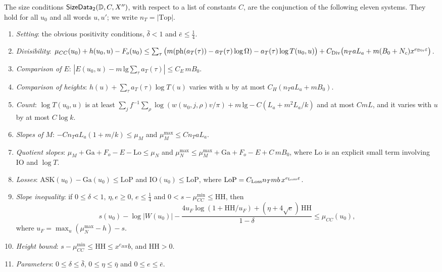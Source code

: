 The size conditions $\mathsf{SizeData}_2(\mathbb D,C,X'')$, with respect to a list of constants $C$,
are the conjunction of the following eleven systems. They hold for all $u_0$ and all words $u,u'$;
we write $n_T=|\mathrm{Top}|$.
\begin{enumerate}[label=(S\arabic*)]
\item\label{S:setting} \emph{Setting}: the obvious positivity conditions, $\bar\delta<1$ and $\bar e\le\frac14$.
\item\label{S:div} \emph{Divisibility}:
$\mu_{CC}(u_0)+h(u_0,u)-F_o(u_0)\le\sum_\tau\big(m(\mathrm{ph}(a_T(\tau))-a_T(\tau)\log\Omega)-a_T(\tau)\log T(u_0,u)\big)
+C_{\rm Div}\big(n_Ta L_a+m(B_0+N_c)x^{e_{\rm Div}\varepsilon}\big)$.
\item\label{S:ecomp} \emph{Comparison of $E$}: $|E(u_0,u)-m\,\mathrm{lg}\sum_\tau a_T(\tau)|\le C_E\,mB_0$.
\item\label{S:hcomp} \emph{Comparison of heights}:
$h(u)+\sum_\tau a_T(\tau)\log T(u)$ varies with $u$ by at most $C_H(n_TaL_a+mB_0)$.
\item\label{S:count} \emph{Count}: $\log T(u_0,u)$ is at least
$\sum_{j}f^{-1}\sum_\rho\log(w(u_0,j,\rho)v/\pi)+m\,\mathrm{lg}-C(L_a+m^2L_a/k)$ and at most $CmL$, and it
varies with $u$ by at most $C\log k$.
\item\label{S:slopes} \emph{Slopes of $M$}: $-C n_TaL_a(1+m/k)\le\mu_M$ and $\mu^{\max}_M\le Cn_TaL_a$.
\item\label{S:quot} \emph{Quotient slopes}:
$\mu_M+\mathrm{Ga}+F_o-E-\mathrm{Lo}\le\mu_N$ and $\mu^{\max}_N\le\mu^{\max}_M+\mathrm{Ga}+F_o-E+C\,mB_0$, where
$\mathrm{Lo}$ is an explicit small term involving $\mathrm{IO}$ and $\log T$.
\item\label{S:loss} \emph{Losses}: $\mathrm{ASK}(u_0)-\mathrm{Ga}(u_0)\le\mathrm{LoP}$ and $\mathrm{IO}(u_0)\le\mathrm{LoP}$,
where $\mathrm{LoP}=C_{\rm Loss}n_Tmb\,x^{e_{\rm Loss}\varepsilon}$.
\item\label{S:slopeineq} \emph{Slope inequality}: if $0\le\delta<1$, $\eta,e\ge0$, $e\le\frac14$ and
$0<s-\mu^{\min}_{CC}\le\mathrm{HH}$, then
\[
s(u_0)-\log|W(u_0)|-\frac{4u_F\log(1+\mathrm{HH}/u_F)+(\eta+4\sqrt e)\,\mathrm{HH}}{1-\delta}\le\mu_{CC}(u_0),
\]
where $u_F=\max_u(\mu^{\max}_N-h)-s$.
\item\label{S:hh} \emph{Height bound}: $s-\mu^{\min}_{CC}\le\mathrm{HH}\le x^{c_{HH}}b$, and $\mathrm{HH}>0$.
\item\label{S:fparams} \emph{Parameters}: $0\le\delta\le\bar\delta$, $0\le\eta\le\bar\eta$ and $0\le e\le\bar e$.
\end{enumerate}

